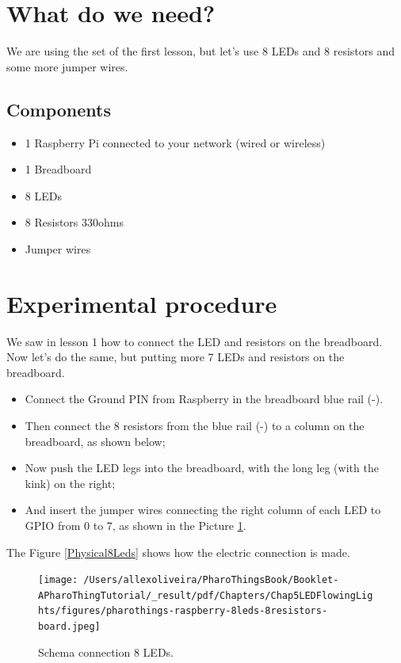 \documentclass[10pt,twoside,english]{_support/latex/sbabook/sbabook}
\begin{document}
\section{What do we need?}
We are using the set of the first lesson, but let's use 8 LEDs and 8 resistors and some more jumper wires.
\subsection{Components}
\begin{itemize}
\item 1 Raspberry Pi connected to your network (wired or wireless)
\item 1 Breadboard
\item 8 LEDs
\item 8 Resistors 330ohms
\item Jumper wires
\end{itemize}
\section{Experimental procedure}
We saw in lesson 1 how to connect the LED and resistors on the breadboard. Now let's do the same, but putting more 7 LEDs and resistors on the breadboard. 

\begin{itemize}
\item Connect the Ground PIN from Raspberry in the breadboard blue rail (-). 
\item Then connect the 8 resistors from the blue rail (-) to a column on the breadboard, as shown below;
\item Now push the LED legs into the breadboard, with the long leg (with the kink) on the right;
\item And insert the jumper wires connecting the right column of each LED to GPIO from 0 to 7, as shown in the Picture \ref{Schema8Leds}.
\end{itemize}

The Figure \ref{Physical8Leds} shows how the electric connection is made.


\begin{figure}

\begin{center}
\texttt{[image: /Users/allexoliveira/PharoThingsBook/Booklet-APharoThingTutorial/\_result/pdf/Chapters/Chap5LEDFlowingLights/figures/pharothings-raspberry-8leds-8resistors-board.jpeg]}\caption{Schema connection 8 LEDs.\label{Schema8Leds}}\end{center}
\end{figure}
\end{document}
